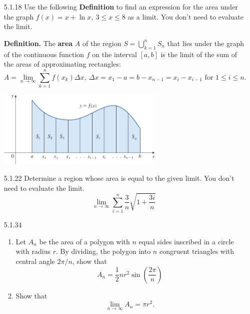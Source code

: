 \documentclass{article}
\begin{document}
\begin{enumerate}
\item[5.1.18]
    Use the following \textbf{Definition} to find an expression for
    the area under the graph $f(x) = x + \ln x,\ 3 \leqslant x \leqslant 8$
    as a limit. You don't need to evaluate the limit.

    \begin{tcolorbox}
        \textbf{Definition.} The \textbf{area} $A$ of the region
        $\displaystyle S = \bigcup_{k=1}^{n} S_{n}$
        that lies under the graph of the continuous function $f$
        on the interval $[a, b]$ is the limit of the sum of the
        areas of approximating rectangles:
        \[
            A = \lim_{n \to \infty} \sum_{k=1}^{n} f(x_{k}) \Delta x
            ,\ \Delta x = x_1 - a = b - x_{n-1} = x_{i} - x_{i-1} \text{ for } 1 \leqslant i \leqslant n.
        \]

        \begin{center}
            \includegraphics[width=8cm]{./png/5.1.18.png}
        \end{center}
    \end{tcolorbox}

\vspace{7cm}

\item[5.1.22]
    Determine a region whose area is equal to the given limit.
    You don't need to evaluate the limit.
    \[
        \lim_{n \to \infty} \sum_{i=1}^{n} \frac{3}{n}\sqrt{1 + \frac{3i}{n}}
    \]

\newpage

\item[5.1.34]
    \begin{enumerate}
        \item
            Let $A_{n}$ be the area of a polygon with $n$ equal sides
            inscribed in a circle with radius $r$. By dividing,
            the polygon into $n$ congruent triangles with central angle $2 \pi / n$,
            show that
            \[
                A_{n} = \frac{1}{2}n r^{2} \sin \left(\frac{2 \pi }{n}\right)
            \]
        \item
            Show that
            \[
                \lim_{n \to \infty} A_{n} = \pi r^{2}.
            \]
    \end{enumerate}


\end{enumerate}
\end{document}
